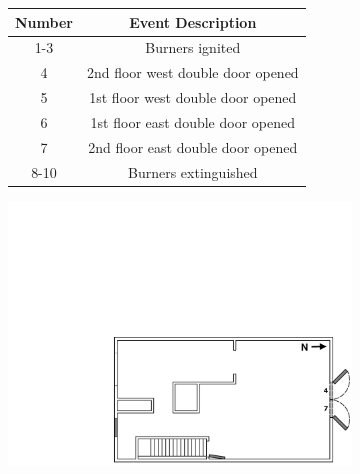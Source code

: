 \documentclass[12pt,oneside]{book}
\begin{document}
\begin{figure}[!ht]
\begin{minipage}[b]{0.8\columnwidth}
\begin{flushleft}
\begin{figure}[!ht]
\begin{minipage}[b]{0.8\columnwidth}
	\begin{flushleft}
	\small
	\begin{tabular}[b]{cc}
 	\toprule
 	\textbf{Number} & \textbf{Event Description} \\
 	\midrule
 	1-3  & Burners ignited \\
 	4	 & 2nd floor west double door opened \\
 	5 	 & 1st floor west double door opened \\
 	6	 & 1st floor east double door opened \\
 	7 	 & 2nd floor east double door opened \\
 	8-10  & Burners extinguished \\
	\bottomrule
	\end{tabular}
	\end{flushleft}
\end{minipage}
\begin{minipage}[b]{0.9\columnwidth}
	\vspace{15pt}
	\centering
	\includegraphics[width=\columnwidth]{../Figures/Floor_Plans/West_Structure_2nd_Floor_Test_22}

\end{minipage}
\end{figure}
\end{flushleft}
\end{minipage}
\end{figure}
\end{document}
